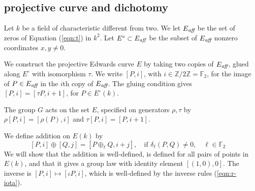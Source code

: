 \documentclass[12pt]{article}
\newcommand{\ring}[1]{\mathbb{#1}}
\newcommand{\op}[1]{\hbox{#1}}
\newcommand{\Eaff}{E_{\op{\scriptsize\it aff}}}
\newcommand{\Eoo}{E^{\circ}} %
\newcommand{\Go}{\langle\rho\rangle}
\begin{document}
\subsection{projective curve and dichotomy}



Let $k$ be a field of characteristic different from two.
We let $\Eaff$ be the set of zeros of 
Equation (\ref{eqn:t}) in $k^2$.
Let $\Eoo\subset \Eaff$ be the subset of $\Eaff$
nonzero coordinates $x,y\ne0$.

We construct the projective Edwards curve $E$ by taking two copies of
$\Eaff$, glued along $\Eoo$ with isomorphism $\tau$.  We write
$[P,i]$, with $i\in \ring{Z}/2\ring{Z}=\ring{F}_2$, for the image of $P\in \Eaff$
in the $i$th copy of $\Eaff$.  The gluing condition gives
$[P,i]=[\tau P,i+1]$, for $P\in \Eoo(k)$.

The group $G$ acts on the set $E$, specified on generators $\rho,\tau$
by $\rho[P,i]=[\rho(P),i]$ and $\tau[P,i]=[P,i+1]$.

We define addition on $E(k)$ by
\[
[P,i]\oplus [Q,j] = [P\oplus_\ell Q,i+j],\quad \text{if } \delta_\ell(P,Q)\ne 0,\quad \ell\in\ring{F}_2
\]
We will show that the addition is well-defined, is defined for all
pairs of points in $E(k)$, and that it gives a group law
with identity element $[(1,0),0]$.
The inverse is $[P,i]\mapsto [\iota P,i]$, which is well-defined by
the inverse rules (\ref{eqn:r-iota}).





\end{document}
